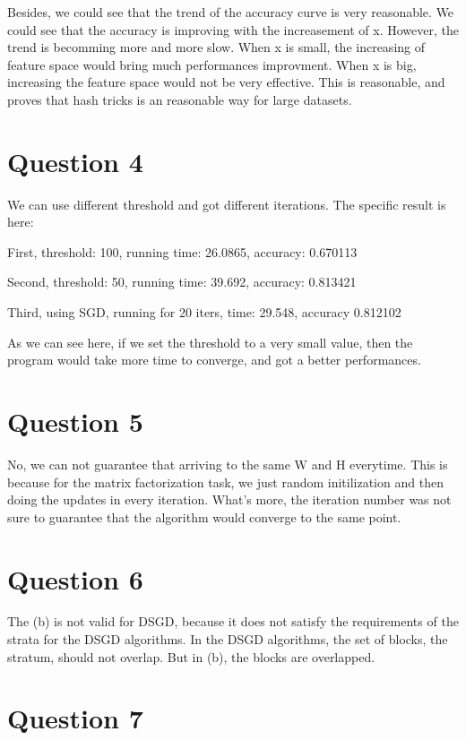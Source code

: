 \documentclass{article} %
\begin{document}
Besides, we could see that the trend of the accuracy curve is very reasonable.
We could see that the accuracy is improving with the increasement of x. However,
the trend is becomming more and more slow. When x is small, the increasing of
feature space would bring much performances improvment. When x is big,
increasing the feature space would not be very effective. This is reasonable,
and proves that hash tricks is an reasonable way for large datasets.



\section{Question 4}

We can use different threshold and got different iterations. The specific result
is here:

First, threshold: 100, running time: 26.0865, accuracy: 0.670113

Second, threshold: 50, running time: 39.692, accuracy: 0.813421

Third, using SGD, running for 20 iters, time: 29.548, accuracy 0.812102

As we can see here, if we set the threshold to a very small value, then the
program would take more time to converge, and got a better performances.



\section{Question 5}

No, we can not guarantee that arriving to the same W and H everytime. This is
because for the matrix factorization task, we just random initilization and
then doing the updates in every iteration. What's more, the iteration number
was not sure to guarantee that the algorithm would converge to the same point.



\section{Question 6}

The (b) is not valid for DSGD, because it does not satisfy the requirements of
the strata for the DSGD algorithms. In the DSGD algorithms, the set of blocks,
the stratum, should not overlap. But in (b), the blocks are overlapped.



\section{Question 7}
\end{document}

